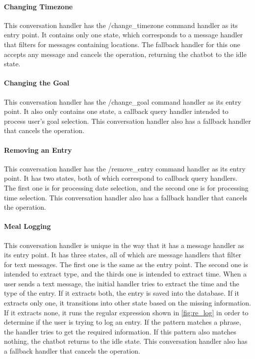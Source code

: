 \paragraph{Changing Timezone} This conversation handler has the /change\_timezone command handler as its entry point.
It contains only one state, which corresponds to a message handler that filters for messages containing locations.
The fallback handler for this one accepts any message and cancels the operation, returning the chatbot to the idle state.

\paragraph{Changing the Goal} This conversation handler has the /change\_goal command handler as its entry point.
It also only contains one state, a callback query handler intended to process user's goal selection.
This conversation handler also has a fallback handler that cancels the operation.

\paragraph{Removing an Entry} This conversation handler has the /remove\_entry command handler as its entry point.
It has two states, both of which correspond to callback query handlers.
The first one is for processing date selection, and the second one is for processing time selection.
This conversation handler also has a fallback handler that cancels the operation.

\paragraph{Meal Logging} This conversation handler is unique in the way that it has a message handler as its entry point.
It has three states, all of which are message handlers that filter for text messages.
The first one is the same as the entry point.
The second one is intended to extract type, and the thirds one is intended to extract time.
When a user sends a text message, the initial handler tries to extract the time and the type of the entry.
If it extracts both, the entry is saved into the database.
If it extracts only one, it transitions into other state based on the missing information.
If it extracts none, it runs the regular expression shown in \autoref{fig:re_log} in order to determine if the user is trying to log an entry.
If the pattern matches a phrase, the handler tries to get the required information.
If this pattern also matches nothing, the chatbot returns to the idle state.
This conversation handler also has a fallback handler that cancels the operation.


